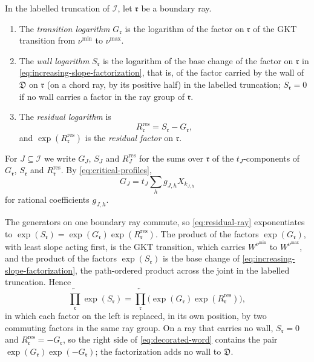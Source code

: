 \begin{definition}
\label{def:raywise-logarithms}
In the labelled truncation of $\mathcal I$, let $\mathfrak r$ be a boundary
ray.
\begin{enumerate}
\item The \emph{transition logarithm} $G_{\mathfrak r}$ is the logarithm of
the factor on $\mathfrak r$ of the GKT transition from $\nu^{\min}$ to
$\nu^{\max}$.
\item The \emph{wall logarithm} $S_{\mathfrak r}$ is the logarithm of the
base change of the factor on $\mathfrak r$ in
\eqref{eq:increasing-slope-factorization}, that is, of the factor carried by
the wall of $\mathfrak D$ on $\mathfrak r$ (on a chord ray, by its positive
half) in the labelled truncation; $S_{\mathfrak r}=0$ if no wall carries a factor
in the ray group of $\mathfrak r$.
\item The \emph{residual logarithm} is
\begin{equation}\label{eq:residual-ray}
 R^{\mathrm{res}}_{\mathfrak r}=S_{\mathfrak r}-G_{\mathfrak r},
\end{equation}
and $\exp(R^{\mathrm{res}}_{\mathfrak r})$ is the \emph{residual factor} on $\mathfrak r$.
\end{enumerate}
For $J\subseteq\mathcal I$ we write $G_J$, $S_J$ and $R^{\mathrm{res}}_J$ for the sums over
$\mathfrak r$ of the $t_J$-components of $G_{\mathfrak r}$, $S_{\mathfrak r}$
and $R^{\mathrm{res}}_{\mathfrak r}$.  By \eqref{eq:critical-profiles},
\begin{equation}\label{eq:GKT-logarithm-J}
 G_J=t_J\sum_hg_{J,h}X_{k_{J,h}}
\end{equation}
for rational coefficients $g_{J,h}$.
\end{definition}

The generators on one boundary ray commute, so \eqref{eq:residual-ray}
exponentiates to $\exp(S_{\mathfrak r})=\exp(G_{\mathfrak r})
\exp(R^{\mathrm{res}}_{\mathfrak r})$.  The product of the factors $\exp(G_{\mathfrak r})$,
with least slope acting first, is the GKT transition, which carries
$W^{\nu^{\min}}$ to $W^{\nu^{\max}}$, and the product of the factors
$\exp(S_{\mathfrak r})$ is the base change of
\eqref{eq:increasing-slope-factorization}, the path-ordered product across the
joint in the labelled truncation.  Hence
\begin{equation}\label{eq:decorated-word}
 \overleftarrow{\prod_{\mathfrak r}}\exp(S_{\mathfrak r})
 =\overleftarrow{\prod_{\mathfrak r}}
  \bigl(\exp(G_{\mathfrak r})\exp(R^{\mathrm{res}}_{\mathfrak r})\bigr),
\end{equation}
in which each factor on the left is replaced, in its own position, by two
commuting factors in the same ray group.  On a ray that carries no wall,
$S_{\mathfrak r}=0$ and $R^{\mathrm{res}}_{\mathfrak r}=-G_{\mathfrak r}$, so the right side
of \eqref{eq:decorated-word} contains the pair
$\exp(G_{\mathfrak r})\exp(-G_{\mathfrak r})$; the factorization adds no wall
to $\mathfrak D$.

